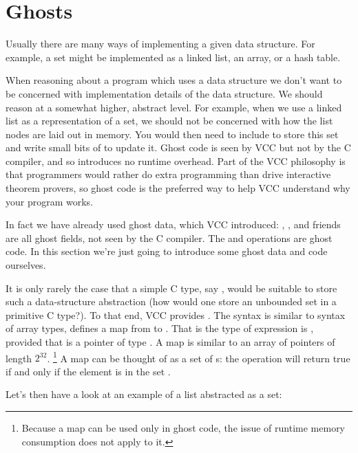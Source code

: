 \section{Ghosts}
\label{sect:ghosts}
Usually there are many ways of implementing a given data structure.
For example, a set might be implemented as a linked list, an array, or a hash table.

When reasoning about a program which uses a data structure we don't want to be
concerned with implementation details of the data structure.
We should reason at a somewhat higher, abstract level.
For example, when we use a linked list as a representation of a set, we should not be concerned
with how the list nodes are laid out in memory.
You would then need to include  to store this set and write small bits of  to
update it.  
Ghost code is seen by VCC but not by the C compiler, and
so introduces no runtime overhead. Part of the VCC philosophy is that
programmers would rather do extra programming than drive interactive
theorem provers, so ghost code is the preferred way to help VCC
understand why your program works.  

In fact we have already used ghost data, which VCC introduced: \vcc{\closed},
\vcc{\owner}, and friends are all ghost fields, not seen by the C compiler.
The  and  operations are ghost code.
In this section we're just going to introduce some ghost data and code ourselves.

It is only rarely the case that a simple C type, say , would be suitable
to store such a data-structure abstraction (how would one store an unbounded set in a primitive C type?).
To that end, VCC provides .
The syntax is similar to syntax of array types,  defines a map  from 
to .
That is the type of expression  is , provided that  is a pointer
of type .
A map  is similar to an array of pointers of length $2^{32}$.%
\footnote{
  Because a map can be used only in ghost code, 
  the issue of runtime memory consumption does not apply to it.}
A map  can be thought of as a set of s: the operation
 will return true if and only if the element  is in the set .

Let's then have a look at an example of a list abstracted as a set:

